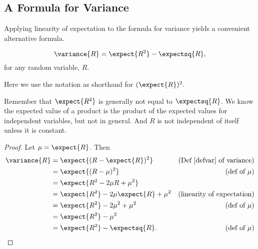 \iffalse
It might seem more straightforward to measure the actual average
deviation directly:
\begin{definition}\label{def:expabsdev}
The \term{expected absolute deviation} of a real-valued random
variable, $R$, is defined to be
\[
\expect{\, \abs{R - \expect{R}}\, }.
\]
\end{definition}

Taking the root mean square has the effect of weighing larger
deviations more heavily than smaller ones.  A consequence is that
Standard deviation is always at least as large as expected absolute
deviation (see Problem~\ref{PS_variance_vs_absolute_deviation}).  \fi


\iffalse
For example, for independent random variables, the variance of a sum
is the sum of the variances; that is, $\variance{R_1 + R_2} =
\variance{R_1} + \variance{R_2}$.  We will prove this fact below.
\fi



\subsection{A Formula for Variance}
Applying linearity of expectation to the formula for variance yields a convenient
alternative formula.
\begin{lemma}\label{alt:var}
\[
\variance{R} = \expect{R^2} - \expectsq{R},
\]
for any random variable, $R$.
\end{lemma}
Here we use the notation  as shorthand for
$(\expect{R})^2$.

\begin{editingnotes}
Remember that $\expect{R^2}$ is generally not equal to $\expectsq{R}$.  We
know the expected value of a product is the product of the expected values
for independent variables, but not in general.  And $R$ is not independent
of itself unless it is constant.

\end{editingnotes}

\begin{proof}
Let $\mu = \expect{R}$.  Then
\begin{align*}
\variance{R} & =   \expect{(R - \expect{R})^2}
               & \text{(Def~\ref{defvar} of variance)}\\
        & = \expect{(R - \mu)^2} & \text{(def of $\mu$)}\\
        & = \expect{R^2 - 2  \mu R + \mu^2} \\
        & = \expect{R^2} - 2 \mu \expect{R} + \mu^2 
                & \text{(linearity of expectation)}\\
        & = \expect{R^2} - 2 \mu^2 + \mu^2
              &  \text{(def of $\mu$)}\\
        & = \expect{R^2} - \mu^2\\
        & = \expect{R^2} - \expectsq{R}.
                  &  \text{(def of $\mu$)}
\end{align*}
\end{proof}

